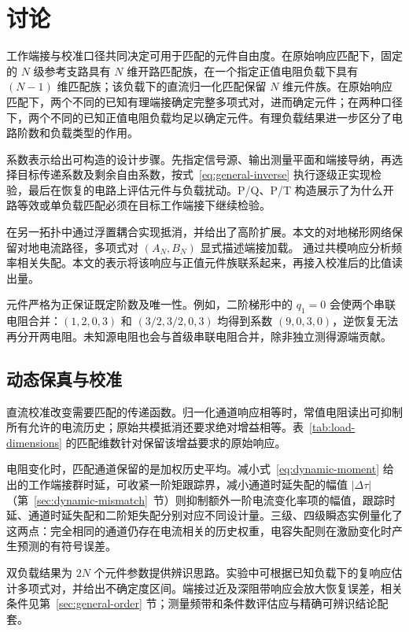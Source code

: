 \section{讨论}

工作端接与校准口径共同决定可用于匹配的元件自由度。在原始响应匹配下，固定的 $N$ 级参考支路具有 $N$ 维开路匹配族，在一个指定正值电阻负载下具有 $(N-1)$ 维匹配族；该负载下的直流归一化匹配保留 $N$ 维元件族。在原始响应匹配下，两个不同的已知有理端接确定完整多项式对，进而确定元件；在两种口径下，两个不同的已知正值电阻负载均足以确定元件。有理负载结果进一步区分了电路阶数和负载类型的作用。

系数表示给出可构造的设计步骤。先指定信号源、输出测量平面和端接导纳，再选择目标传递系数及剩余自由系数，按式~\eqref{eq:general-inverse} 执行逐级正实现检验，最后在恢复的电路上评估元件与负载扰动。P/Q、P/T 构造展示了为什么开路等效或单负载匹配必须在目标工作端接下继续检验。

\citet{casas1996basics} 在另一拓扑中通过浮置耦合实现抵消，并给出了高阶扩展。本文的对地梯形网络保留对地电流路径，多项式对 $(A_N,B_N)$ 显式描述端接加载。\citet{hornero2021cm} 通过共模响应分析频率相关失配。本文的表示将该响应与正值元件族联系起来，再接入校准后的比值读出量。

元件严格为正保证既定阶数及唯一性。例如，二阶梯形中的 $q_1=0$ 会使两个串联电阻合并：$(1,2,0,3)$ 和 $(3/2,3/2,0,3)$ 均得到系数 $(9,0,3,0)$，逆恢复无法再分开两电阻。未知源电阻也会与首级串联电阻合并，除非独立测得源端贡献。

\subsection{动态保真与校准}

直流校准改变需要匹配的传递函数。归一化通道响应相等时，常值电阻读出可抑制所有允许的电流历史；原始共模抵消还要求绝对增益相等。表~\ref{tab:load-dimensions} 的匹配维数针对保留该增益要求的原始响应。

电阻变化时，匹配通道保留的是加权历史平均。减小式~\eqref{eq:dynamic-moment} 给出的工作端接群时延，可收紧一阶矩跟踪界，减小通道时延失配的幅值 $|\Delta\tau|$（第~\ref{sec:dynamic-mismatch}~节）则抑制额外一阶电流变化率项的幅值，跟踪时延、通道时延失配和二阶矩失配分别对应不同设计量。三级、四级瞬态实例量化了这两点：完全相同的通道仍存在电流相关的历史权重，电容失配则在激励变化时产生预测的有符号误差。

双负载结果为 $2N$ 个元件参数提供辨识思路。实验中可根据已知负载下的复响应估计多项式对，并给出不确定度区间。端接过近及深阻带响应会放大恢复误差，相关条件见第~\ref{sec:general-order} 节；测量频带和条件数评估应与精确可辨识结论配套。

